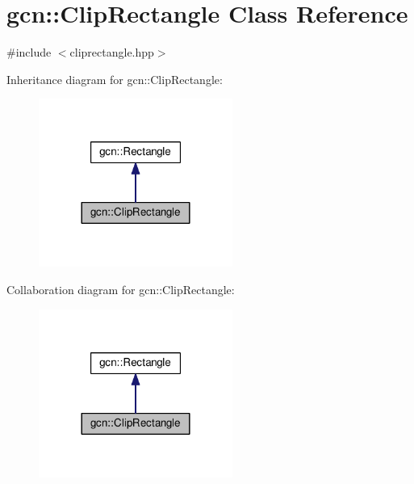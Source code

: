 \hypertarget{classgcn_1_1ClipRectangle}{}\section{gcn\+:\+:Clip\+Rectangle Class Reference}
\label{classgcn_1_1ClipRectangle}


{\ttfamily \#include $<$cliprectangle.\+hpp$>$}



Inheritance diagram for gcn\+:\+:Clip\+Rectangle\+:\nopagebreak
\begin{figure}[H]
\begin{center}
\leavevmode
\includegraphics[width=180pt]{classgcn_1_1ClipRectangle__inherit__graph}
\end{center}
\end{figure}


Collaboration diagram for gcn\+:\+:Clip\+Rectangle\+:\nopagebreak
\begin{figure}[H]
\begin{center}
\leavevmode
\includegraphics[width=180pt]{classgcn_1_1ClipRectangle__coll__graph}
\end{center}
\end{figure}

